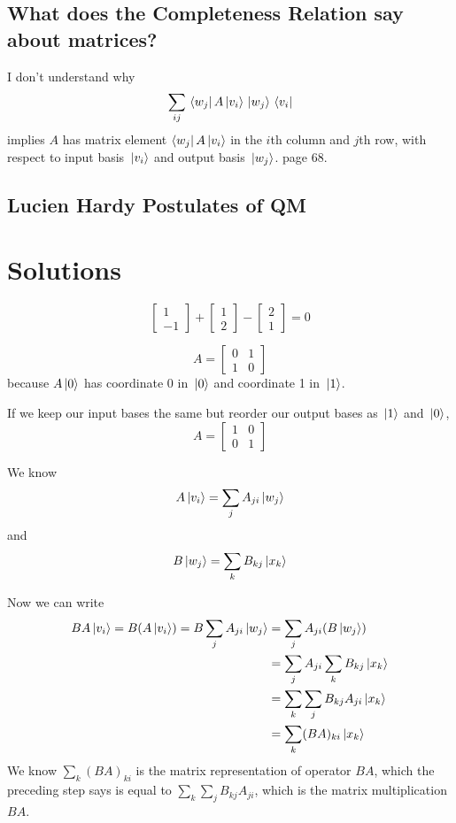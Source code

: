\subsection{What does the Completeness Relation say about matrices?}

I don't understand why $$\sum_{ij} \bra*{w_{j}} A \ket*{v_{i}} \ket*{w_{j}} \bra*{v_{i}}$$ implies $A$ has matrix element $\bra{w_{j}} A \ket*{v_{i}}$ in the $i$th column and $j$th row, with respect to input basis $\ket*{v_{i}}$ and output basis $\ket*{w_{j}}$. page 68. 

\subsection{Lucien Hardy Postulates of QM}

\section{Solutions}

\exercise
$$\begin{bmatrix}
1 \\
-1
\end{bmatrix} + \begin{bmatrix}
1 \\
2 
\end{bmatrix} - \begin{bmatrix}
2 \\
1
\end{bmatrix} = 0$$

\exercise
$$A = \begin{bmatrix}
0 & 1 \\
1 & 0
\end{bmatrix}$$ because $A\ket*{0}$ has coordinate 0 in $\ket*{0}$ and coordinate 1 in $\ket*{1}$. 

If we keep our input bases the same but reorder our output bases as $\ket*{1}$ and $\ket*{0}$, 
$$A = \begin{bmatrix}
1 & 0 \\
0 & 1
\end{bmatrix}$$

\exercise 
We know 
$$A \ket*{v_{i}} = \sum_{j} A_{ji} \ket*{w_{j}}$$
and 
$$B \ket*{w_{j}} = \sum_{k} B_{kj} \ket*{x_{k}}$$

Now we can write 
$$
\begin{aligned}
BA \ket*{v_{i}} = B ( A \ket*{v_{i}} ) = B \sum_{j} A_{ji} \ket*{w_{j}} &= \sum_{j} A_{ji} (B \ket*{w_{j}}) \\
&= \sum_{j} A_{ji} \sum_{k} B_{kj} \ket*{x_{k}} \\
&= \sum_{k} \sum_{j} B_{kj} A_{ji} \ket*{x_{k}} \\
&= \sum_{k} (BA)_{ki} \ket*{x_{k}}
\end{aligned}
$$
We know $\sum_{k} (BA)_{ki}$ is the matrix representation of operator $BA$, which the preceding step says is equal to $\sum_{k} \sum_{j} B_{kj} A_{ji}$, which is the matrix multiplication $BA$. 

